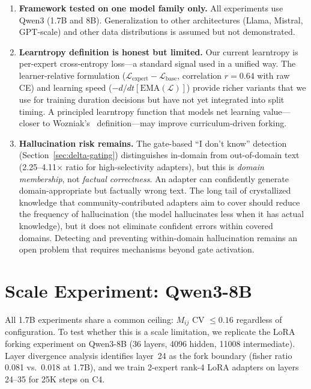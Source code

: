 \documentclass{article}
\begin{document}
\begin{enumerate}
    \item \textbf{Framework tested on one model family only.} All experiments use
          Qwen3 (1.7B and 8B). Generalization to other architectures (Llama,
          Mistral, GPT-scale) and other data distributions is assumed but not
          demonstrated.
    \item \textbf{Learntropy definition is honest but limited.} Our current
          learntropy is per-expert cross-entropy loss---a standard signal used
          in a unified way. The learner-relative formulation
          ($\mathcal{L}_{\text{expert}} - \mathcal{L}_{\text{base}}$, correlation
          $r = 0.64$ with raw CE) and learning speed
          ($-d/dt[\text{EMA}(\mathcal{L})]$) provide richer variants that we
          use for training duration decisions but have not yet integrated into
          split timing. A principled learntropy function that models net
          learning value---closer to Wozniak's~\cite{wozniak2018learntropy}
          definition---may improve curriculum-driven forking.
    \item \textbf{Hallucination risk remains.} The gate-based ``I don't know''
          detection (Section~\ref{sec:delta-gating}) distinguishes in-domain from
          out-of-domain text (2.25--4.11$\times$ ratio for high-selectivity
          adapters), but this is \emph{domain membership}, not \emph{factual
          correctness}. An adapter can confidently generate domain-appropriate
          but factually wrong text. The long tail of crystallized knowledge that
          community-contributed adapters aim to cover should reduce the frequency
          of hallucination (the model hallucinates less when it has actual
          knowledge), but it does not eliminate confident errors within covered
          domains. Detecting and preventing within-domain hallucination remains
          an open problem that requires mechanisms beyond gate activation.
\end{enumerate}

\section{Scale Experiment: Qwen3-8B}
\label{sec:8b}

All 1.7B experiments share a common ceiling: $M_{ij}$ CV $\leq 0.16$ regardless
of configuration. To test whether this is a scale limitation, we replicate the
LoRA forking experiment on Qwen3-8B (36 layers, 4096 hidden, 11008
intermediate). Layer divergence analysis identifies layer~24 as the fork
boundary (fisher ratio 0.081 vs.\ 0.018 at 1.7B), and we train 2-expert
rank-4 LoRA adapters on layers 24--35 for 25K steps on C4.
\end{document}
